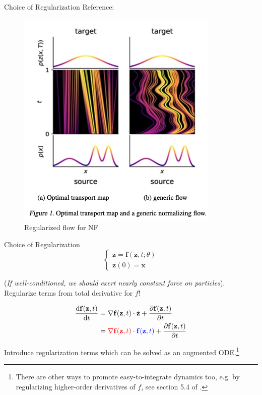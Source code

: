 \documentclass[usenames,dvipsnames]{beamer}
\theoremstyle{definition}
\let\oldcite=\cite
\renewcommand{\cite}[2][]{\textcolor{green}{\oldcite[#1]{#2}}}
\begin{document}


\begin{frame}{Choice of Regularization}
    Reference: \cite{finlay_how_2020}

    \begin{figure}
        \centering
        \includegraphics[width=0.6\linewidth]{ot_vs_generic_NF.jpg}
        \caption{Regularized flow for NF}
        \label{fig:reg_ot}
    \end{figure}
\end{frame}

\begin{frame}{Choice of Regularization}
    $$\begin{cases}\dot{\mathbf{z}}=\mathbf{f}(\mathbf{z},t;\theta)\\\mathbf{z}(0)=\mathbf{x}\end{cases}$$

  (\emph{If well-conditioned, we should exert nearly constant force on particles}). Regularize terms from total derivative for $f$! 

    $$\begin{aligned}
        {\frac{\mathrm{d}\mathbf{f}(\mathbf{z},t)}{\mathrm{d}t}}& =\nabla\mathbf{f}(\mathbf{z},t)\cdot\dot{\mathbf{z}}+\frac{\partial\mathbf{f}(\mathbf{z},t)}{\partial t}  \\
        &=\textcolor{red}{\nabla\mathbf{f}(\mathbf{z},t)}\cdot\textcolor{blue}{\mathbf{f}(\mathbf{z},t)}+{\frac{\partial\mathbf{f}(\mathbf{z},t)}{\partial t}}
        \end{aligned}$$

    Introduce regularization terms which can be solved as an augmented ODE.\footnote{There are other ways to promote easy-to-integrate dynamics too, e.g. by regularizing higher-order derivatives of $f$, see section 5.4 of \cite{kidger_neural_2022}.}
\end{frame}
\end{document}
